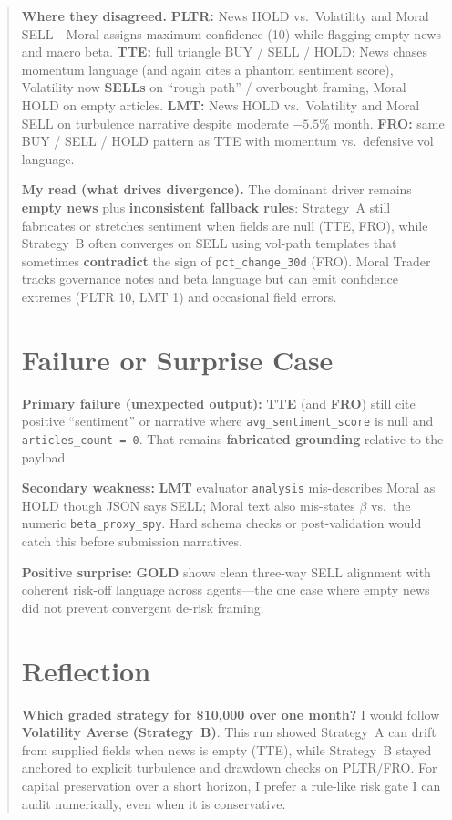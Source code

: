 \documentclass[11pt]{article}
\begin{document}
\begin{abstract}
\textbf{Where they disagreed.} \textbf{PLTR:} News HOLD vs.\ Volatility and Moral SELL---Moral assigns maximum confidence (10) while flagging empty news and macro beta. \textbf{TTE:} full triangle BUY / SELL / HOLD: News chases momentum language (and again cites a phantom sentiment score), Volatility now \textbf{SELLs} on ``rough path'' / overbought framing, Moral HOLD on empty articles. \textbf{LMT:} News HOLD vs.\ Volatility and Moral SELL on turbulence narrative despite moderate $-5.5\%$ month. \textbf{FRO:} same BUY / SELL / HOLD pattern as TTE with momentum vs.\ defensive vol language.

\textbf{My read (what drives divergence).} The dominant driver remains \textbf{empty news} plus \textbf{inconsistent fallback rules}: Strategy~A still fabricates or stretches sentiment when fields are null (TTE, FRO), while Strategy~B often converges on SELL using vol-path templates that sometimes \textbf{contradict} the sign of \texttt{pct\_change\_30d} (FRO). Moral Trader tracks governance notes and beta language but can emit confidence extremes (PLTR 10, LMT 1) and occasional field errors.

\section{Failure or Surprise Case}

\textbf{Primary failure (unexpected output):} \textbf{TTE} (and \textbf{FRO}) still cite positive ``sentiment'' or narrative where \texttt{avg\_sentiment\_score} is null and \texttt{articles\_count = 0}. That remains \textbf{fabricated grounding} relative to the payload.

\textbf{Secondary weakness:} \textbf{LMT} evaluator \texttt{analysis} mis-describes Moral as HOLD though JSON says SELL; Moral text also mis-states $\beta$ vs.\ the numeric \texttt{beta\_proxy\_spy}. Hard schema checks or post-validation would catch this before submission narratives.

\textbf{Positive surprise:} \textbf{GOLD} shows clean three-way SELL alignment with coherent risk-off language across agents---the one case where empty news did not prevent convergent de-risk framing.

\section{Reflection}

\textbf{Which graded strategy for \$10{,}000 over one month?} I would follow \textbf{Volatility Averse (Strategy~B)}. This run showed Strategy~A can drift from supplied fields when news is empty (TTE), while Strategy~B stayed anchored to explicit turbulence and drawdown checks on PLTR/FRO. For capital preservation over a short horizon, I prefer a rule-like risk gate I can audit numerically, even when it is conservative.


\end{abstract}
\end{document}
